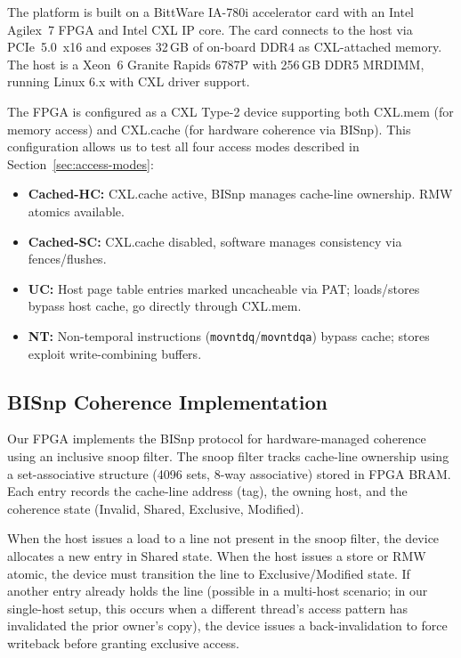 The platform is built on a BittWare IA-780i accelerator card with an Intel Agilex~7 FPGA and Intel CXL IP core.
The card connects to the host via PCIe~5.0~x16 and exposes 32\,GB of on-board DDR4 as CXL-attached memory.
The host is a Xeon~6 Granite Rapids 6787P with 256\,GB DDR5 MRDIMM, running Linux 6.x with CXL driver support.

The FPGA is configured as a CXL Type-2 device supporting both CXL.mem (for memory access) and CXL.cache (for hardware coherence via BISnp).
This configuration allows us to test all four access modes described in Section~\ref{sec:access-modes}:
\begin{itemize}
    \item \textbf{Cached-HC:} CXL.cache active, BISnp manages cache-line ownership. RMW atomics available.
    \item \textbf{Cached-SC:} CXL.cache disabled, software manages consistency via fences/flushes.
    \item \textbf{UC:} Host page table entries marked uncacheable via PAT; loads/stores bypass host cache, go directly through CXL.mem.
    \item \textbf{NT:} Non-temporal instructions (\texttt{movntdq}/\texttt{movntdqa}) bypass cache; stores exploit write-combining buffers.
\end{itemize}

\subsection{BISnp Coherence Implementation}

Our FPGA implements the BISnp protocol for hardware-managed coherence using an inclusive snoop filter.
The snoop filter tracks cache-line ownership using a set-associative structure (4096 sets, 8-way associative) stored in FPGA BRAM.
Each entry records the cache-line address (tag), the owning host, and the coherence state (Invalid, Shared, Exclusive, Modified).

When the host issues a load to a line not present in the snoop filter, the device allocates a new entry in Shared state.
When the host issues a store or RMW atomic, the device must transition the line to Exclusive/Modified state.
If another entry already holds the line (possible in a multi-host scenario; in our single-host setup, this occurs when a different thread's access pattern has invalidated the prior owner's copy), the device issues a back-invalidation to force writeback before granting exclusive access.

